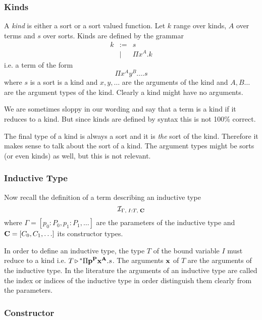 \subsubsection{Kinds}

\begin{definition}
  A \emph{kind} is either a sort or a sort valued function. Let $k$ range
  over kinds, $A$ over terms and $s$ over sorts. Kinds are defined by the
  grammar
  $$
  \begin{array}{lll}
    k
    &:=& s
    \\
    &\mid& \Pi x^A. k
  \end{array}
  $$
  i.e. a term of the form
  $$
  \Pi x^A y^B \ldots . s
  $$
  where $s$ is a sort is a kind and $x, y, \ldots$ are the arguments of the
  kind and $A, B \ldots$ are the argument types of the kind. Clearly a kind
  might have no arguments.

  We are sometimes sloppy in our wording and say that a term is a kind if it
  reduces to a kind. But since kinds are defined by syntax this is not 100\%
  correct.

  The final type of a kind is always a sort and it is \emph{the} sort of the
  kind. Therefore it makes sense to talk about the sort of a kind. The
  argument types might be sorts (or even kinds) as well, but this is not
  relevant.
\end{definition}



\subsubsection{Inductive Type}

Now recall the definition of a term describing an inductive type
$$
{\cal I }_{\Gamma, \; I:T, \; \mathbf{C}}
$$
where $\Gamma = [p_0:P_0, p_1: P_1, \ldots]$ are the parameters of the
inductive type and $\mathbf{C} = [C_0, C_1, \ldots]$ its constructor types.

In order to define an inductive type, the type $T$ of the bound variable $I$
must reduce to a kind i.e. $T {\,\triangleright\,}^* \Pi \mathbf{p}^{\mathbf{P}} \mathbf{x}^{\mathbf{A}}. s$. The
arguments $\mathbf{x}$ of $T$ are the arguments of the inductive type. In the
literature the arguments of an inductive type are called the index or indices of
the inductive type in order distinguish them clearly from the parameters.





\subsubsection{Constructor}

